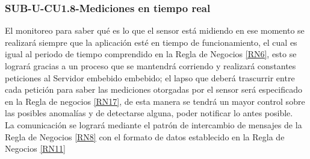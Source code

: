 \subsubsection{SUB-U-CU1.8-Mediciones en tiempo real}\label{SUB-U-CU1.8}
El monitoreo para saber qué es lo que el sensor está midiendo en ese momento se realizará siempre que la aplicación esté en tiempo de funcionamiento, el cual es igual al periodo de tiempo comprendido en la Regla de Negocios \ref{RN6}, esto se logrará gracias a un proceso que se mantendrá corriendo y realizará constantes peticiones al Servidor embebido embebido; el lapso que deberá trascurrir entre cada petición para saber las mediciones otorgadas por el sensor será especificado en la Regla de negocios \ref{RN17}, de esta manera se tendrá un mayor control sobre las posibles anomalías y de detectarse alguna, poder notificar lo antes posible.
\\ La comunicación se logrará mediante el patrón de intercambio de mensajes de la Regla de Negocios \ref{RN8} con el formato de datos establecido en la Regla de Negocios \ref{RN11}  

